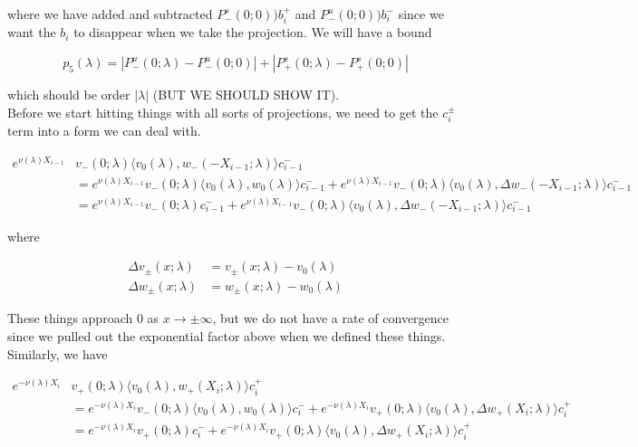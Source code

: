 \documentclass[12pt]{article}
\begin{document}
\begin{enumerate}
where we have added and subtracted $P^s_-(0; 0))b_i^+$ and $P^u_-(0; 0))b_i^-$ since we want the $b_i$ to disappear when we take the projection. We will have a bound

\[
p_5(\lambda) = |P^u_-(0;\lambda) - P^u_-(0; 0)| + |P^s_+(0;\lambda) - P^s_+(0;0)|
\]

which should be order $|\lambda|$ (BUT WE SHOULD SHOW IT).\\

Before we start hitting things with all sorts of projections, we need to get the $c_i^\pm$ term into a form we can deal with. 

\begin{align*}
e^{\nu(\lambda)X_{i-1}} &v_-(0; \lambda) \langle v_0(\lambda), w_-(-X_{i-1}; \lambda) \rangle c_{i-1}^- \\
&= e^{\nu(\lambda)X_{i-1}} v_-(0; \lambda) \langle v_0(\lambda), w_0(\lambda) \rangle c_{i-1}^- + e^{\nu(\lambda)X_{i-1}} v_-(0; \lambda) \langle v_0(\lambda), \Delta w_-(-X_{i-1}; \lambda) \rangle c_{i-1}^- \\
&= e^{\nu(\lambda)X_{i-1}} v_-(0; \lambda) c_{i-1}^- + e^{\nu(\lambda)X_{i-1}} v_-(0; \lambda) \langle v_0(\lambda), \Delta w_-(-X_{i-1}; \lambda) \rangle c_{i-1}^-
\end{align*}

where 

\begin{align*}
\Delta v_\pm(x; \lambda) &= v_\pm(x; \lambda) - v_0(\lambda) \\
\Delta w_\pm(x; \lambda) &= w_\pm(x; \lambda) - w_0(\lambda)
\end{align*}

These things approach 0 as $x \rightarrow \pm \infty$, but we do not have a rate of convergence since we pulled out the exponential factor above when we defined these things.\\

Similarly, we have

\begin{align*}
e^{-\nu(\lambda)X_i} &v_+(0; \lambda) \langle v_0(\lambda), w_+(X_i; \lambda) \rangle c_i^+ \\
&= e^{-\nu(\lambda)X_i} v_-(0; \lambda) \langle v_0(\lambda), w_0(\lambda) \rangle c_i^- + e^{-\nu(\lambda)X_i} v_+(0; \lambda) \langle v_0(\lambda), \Delta w_+(X_i; \lambda) \rangle c_i^+ \\
&= e^{-\nu(\lambda)X_i} v_+(0; \lambda) c_i^- + e^{-\nu(\lambda)X_i} v_+(0; \lambda) \langle v_0(\lambda), \Delta w_+(X_i; \lambda) \rangle c_i^+
\end{align*}


\end{enumerate}
\end{document}
